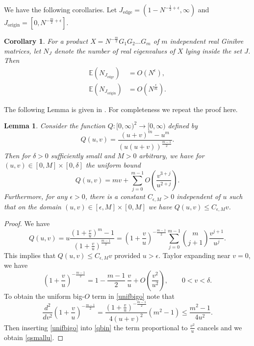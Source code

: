 \documentclass[11pt,reqno]{amsproc}
\newtheorem{lemma}[theorem]{Lemma}
\newtheorem{corollary}[theorem]{Corollary}
\numberwithin{equation}{section}
\numberwithin{theorem}{section}
\begin{document}
We have the following corollaries. Let $J_{\mathrm{edge}} = (1-N^{-\frac{1}{2}+\epsilon},\infty)$ and $J_{\mathrm{origin}} = [0,N^{-\frac{m}{2}+\epsilon}]$.
\begin{corollary}
For a product $X = N^{-\frac{m}{2}}G_{1}G_{2}\ldots G_{m}$ of $m$ independent real Ginibre matrices, let $N_{J}$ denote the number of real eigenvalues of $X$ lying inside the set $J$. Then
\begin{align}
\mathbb{E}(N_{J_{\mathrm{edge}}}) &= O(N^{\epsilon}),\\
\mathbb{E}(N_{J_{\mathrm{origin}}}) &= O(N^{\frac{\epsilon}{m}}).
\end{align}
\end{corollary}
The following Lemma is given in \cite{LMS21}. For completeness we repeat the proof here.
\begin{lemma}
\label{lem:qbound}
Consider the function $Q : [0,\infty)^{2} \to [0,\infty)$ defined by
\begin{equation}
Q(u,v) = \frac{(u+v)^{m}-u^{m}}{(u(u+v))^{\frac{m-1}{2}}}. \label{qdef}
\end{equation}
Then for $\delta>0$ sufficiently small and $M>0$ arbitrary, we have for $(u,v) \in [0,M] \times [0,\delta]$ the uniform bound
\begin{equation}
Q(u,v) = mv + \sum_{j=0}^{m-1}O\left(\frac{v^{3+j}}{u^{2+j}}\right). \label{qsmallu}
\end{equation}
Furthermore, for any $\epsilon>0$, there is a constant $C_{\epsilon,M}>0$ independent of $u$ such that on the domain $(u,v) \in [\epsilon,M] \times [0,M]$ we have $Q(u,v) \leq C_{\epsilon,M}v$.
\end{lemma}

\begin{proof}
We have
\begin{equation}
Q(u,v) = u\frac{\left(1+\frac{v}{u}\right)^{m}-1}{\left(1+\frac{v}{u}\right)^{\frac{m-1}{2}}} = \left(1+\frac{v}{u}\right)^{-\frac{m-1}{2}}\sum_{j=0}^{m-1}\binom{m}{j+1}\frac{v^{j+1}}{u^{j}}. \label{qbin}
\end{equation}
This implies that $Q(u,v)\leq C_{\epsilon,M}v$ provided $u > \epsilon$. Taylor expanding near $v=0$, we have
\begin{equation}
\left(1+\frac{v}{u}\right)^{-\frac{m-1}{2}} = 1 - \frac{m-1}{2}\,\frac{v}{u} + O\left(\frac{v^{2}}{u^{2}}\right), \qquad 0 < v < \delta. \label{unifbigo}
\end{equation}
To obtain the uniform big-$O$ term in \eqref{unifbigo} note that 
\begin{equation}
\frac{d^{2}}{dv^{2}}\left(1+\frac{v}{u}\right)^{-\frac{m-1}{2}} = \frac{\left(1+\frac{v}{u}\right)^{-\frac{m-1}{2}}}{4(u+v)^{2}}(m^{2}-1) \leq \frac{m^{2}-1}{4u^{2}}.
\end{equation}
Then inserting \eqref{unifbigo} into \eqref{qbin} the term proportional to $\frac{v^{2}}{u}$ cancels and we obtain \eqref{qsmallu}.
\end{proof}



\end{document}
